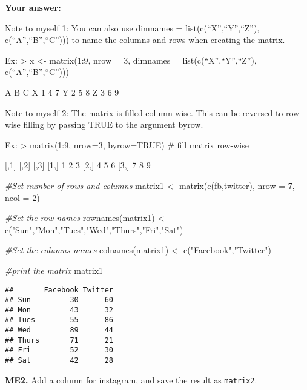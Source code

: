 \documentclass[
]{article}
\newenvironment{Shaded}{\begin{snugshade}}{\end{snugshade}}
\newcommand{\AttributeTok}[1]{\textcolor[rgb]{0.77,0.63,0.00}{#1}}
\newcommand{\CommentTok}[1]{\textcolor[rgb]{0.56,0.35,0.01}{\textit{#1}}}
\newcommand{\DecValTok}[1]{\textcolor[rgb]{0.00,0.00,0.81}{#1}}
\newcommand{\FunctionTok}[1]{\textcolor[rgb]{0.00,0.00,0.00}{#1}}
\newcommand{\NormalTok}[1]{#1}
\newcommand{\OtherTok}[1]{\textcolor[rgb]{0.56,0.35,0.01}{#1}}
\newcommand{\StringTok}[1]{\textcolor[rgb]{0.31,0.60,0.02}{#1}}
\begin{document}
\textbf{Your answer:}

Note to myself 1: You can also use dimnames = list(c(``X'',``Y'',``Z''),
c(``A'',``B'',``C''))) to name the columns and rows when creating the
matrix.

Ex: \textgreater{} x \textless- matrix(1:9, nrow = 3, dimnames =
list(c(``X'',``Y'',``Z''), c(``A'',``B'',``C'')))

A B C X 1 4 7 Y 2 5 8 Z 3 6 9

Note to myself 2: The matrix is filled column-wise. This can be reversed
to row-wise filling by passing TRUE to the argument byrow.

Ex: \textgreater{} matrix(1:9, nrow=3, byrow=TRUE) \# fill matrix
row-wise

{[},1{]} {[},2{]} {[},3{]} {[}1,{]} 1 2 3 {[}2,{]} 4 5 6 {[}3,{]} 7 8 9

\begin{Shaded}
\begin{Highlighting}[]
\CommentTok{\#Set number of rows and columns}
\NormalTok{matrix1 }\OtherTok{\textless{}{-}} \FunctionTok{matrix}\NormalTok{(}\FunctionTok{c}\NormalTok{(fb,twitter), }\AttributeTok{nrow =} \DecValTok{7}\NormalTok{, }\AttributeTok{ncol =} \DecValTok{2}\NormalTok{)}

\CommentTok{\#Set the row names}
\FunctionTok{rownames}\NormalTok{(matrix1) }\OtherTok{\textless{}{-}} \FunctionTok{c}\NormalTok{(}\StringTok{"Sun"}\NormalTok{,}\StringTok{"Mon"}\NormalTok{,}\StringTok{"Tues"}\NormalTok{,}\StringTok{"Wed"}\NormalTok{,}\StringTok{"Thurs"}\NormalTok{,}\StringTok{"Fri"}\NormalTok{,}\StringTok{"Sat"}\NormalTok{)}

\CommentTok{\#Set the columns names}
\FunctionTok{colnames}\NormalTok{(matrix1) }\OtherTok{\textless{}{-}} \FunctionTok{c}\NormalTok{(}\StringTok{"Facebook"}\NormalTok{,}\StringTok{"Twitter"}\NormalTok{)}

\CommentTok{\#print the matrix}
\NormalTok{matrix1}
\end{Highlighting}
\end{Shaded}

\begin{verbatim}
##       Facebook Twitter
## Sun         30      60
## Mon         43      32
## Tues        55      86
## Wed         89      44
## Thurs       71      21
## Fri         52      30
## Sat         42      28
\end{verbatim}

\textbf{ME2.} Add a column for instagram, and save the result as
\texttt{matrix2}.
\end{document}
